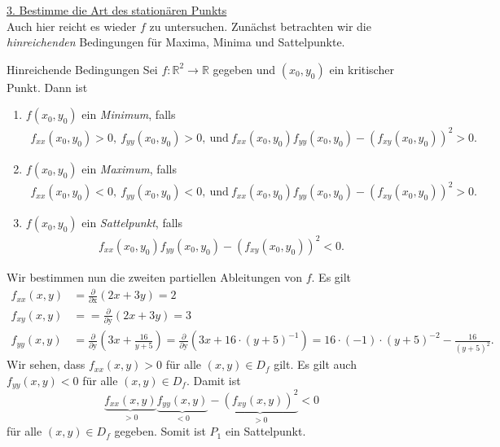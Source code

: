 \newpage

\underline{3. Bestimme die Art des stationären Punkts}\\
Auch hier reicht es wieder $f$ zu untersuchen.
Zunächst betrachten wir die \textit{hinreichenden} Bedingungen für Maxima, Minima und Sattelpunkte.\\

\begin{mybox}{Hinreichende Bedingungen}
Sei $f : \mathbb{R}^2 \to \mathbb{R}$ gegeben und $(x_0,y_0) $ ein kritischer Punkt.
Dann ist
\renewcommand{\labelenumi}{\theenumi.}
\begin{enumerate}
\item
{}
$f(x_0,y_0)$ ein \textit{Minimum}, falls
\begin{align*}
f_{xx}(x_0,y_0) > 0, \ f_{yy}(x_0,y_0) > 0, \ \text{und} \ f_{xx}(x_0,y_0)f_{yy}(x_0,y_0) - (f_{xy}(x_0,y_0))^2  > 0.
\end{align*}

\item
{}
$f(x_0,y_0)$ ein \textit{Maximum}, falls
\begin{align*}
f_{xx}(x_0,y_0) < 0, \ f_{yy}(x_0,y_0) < 0, \ \text{und} \ f_{xx}(x_0,y_0)f_{yy}(x_0,y_0) - (f_{xy}(x_0,y_0))^2  > 0.
\end{align*}

\item
{}
$f(x_0,y_0)$ ein \textit{Sattelpunkt}, falls
\begin{align*}
f_{xx}(x_0,y_0)f_{yy}(x_0,y_0) - (f_{xy}(x_0,y_0))^2  < 0.
\end{align*}
\end{enumerate}
\end{mybox}
Wir bestimmen nun die zweiten partiellen Ableitungen von $f$.
Es gilt
\begin{equation*}
\begin{split}
f_{xx}(x,y)  &= 
\frac{\partial}{\partial \mathrm{x}} (2x + 3y) = 2
 \\
f_{xy}(x,y)  &=
= \frac{\partial}{\partial \mathrm{y}} (2x + 3y) 
= 3 \\
f_{yy}(x,y) &= 
\frac{\partial}{\partial \mathrm{y}} \left(3x + \frac{16}{y+5} \right)
=
\frac{\partial}{\partial \mathrm{y}} \left(3x + 16 \cdot (y+5)^{-1} \right)
= 16 \cdot (-1)\cdot(y+5)^{-2}
- \frac{16}{(y+5)^2}.
\end{split}
\end{equation*}
Wir sehen, dass $f_{xx}(x,y) > 0$ für alle $(x,y) \in D_f$ gilt. 
Es gilt auch $f_{yy}(x,y) < 0 $ für alle $(x,y) \in D_f$.
Damit ist 
\begin{equation*}
\underbrace{f_{xx}(x,y)}_{>0} \underbrace{f_{yy} (x,y)}_{< 0 } - \underbrace{(f_{xy}(x,y))^2}_{>0} < 0
\end{equation*}
für alle $(x,y) \in D_f$ gegeben.
Somit ist $P_1 $ ein Sattelpunkt.

